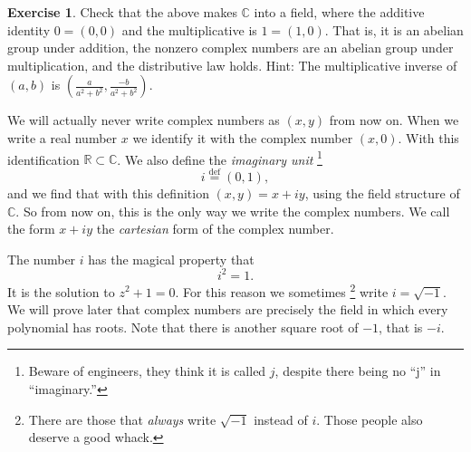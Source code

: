 \documentclass[12pt,openany]{book}
\newcommand{\C}{{\mathbb{C}}}
\newcommand{\R}{{\mathbb{R}}}
\newcommand{\myindex}[1]{#1\index{#1}}
\theoremstyle{plain}
\theoremstyle{remark}
\newtheorem{remark}[thm]{Remark}
\theoremstyle{definition}
\newenvironment{exbox}{%
    \def\FrameCommand{\vrule width 1pt \relax\hspace {10pt}}%
    \MakeFramed {\advance \hsize -\width \FrameRestore }%
}{%
    \endMakeFramed
}
\theoremstyle{exercise}
\newtheorem{exercise}{Exercise}[section]
\theoremstyle{example}
\begin{document}
\begin{exbox}
\begin{exercise}
Check that the above makes $\C$ into a field, where the additive
identity $0=(0,0)$ and the multiplicative is $1=(1,0)$.
That is, it is an abelian group under addition,
the nonzero complex numbers are an abelian group under multiplication,
and the distributive law holds.  Hint: The multiplicative inverse of $(a,b)$
is $\left(\frac{a}{a^2+b^2},\frac{-b}{a^2+b^2}\right)$.
\end{exercise}
\end{exbox}

We will actually never write complex numbers as $(x,y)$ from now on.
When we write a real number $x$ we identify it with the
complex number $(x,0)$.
With this identification $\R \subset \C$.
We also define the \emph{\myindex{imaginary unit}}%
\footnote{Beware of engineers, they think it is called $j$, despite there
being no ``j'' in ``imaginary.''}%
\begin{equation*}
i \overset{\text{def}}{=} (0,1) ,
\end{equation*}
and we find that with this definition $(x,y) = x+iy$, using the field
structure of $\C$.  So from now on, this is the only way we write
the complex numbers.  We call the form $x+iy$ the \emph{\myindex{cartesian}}
form of the complex number.

The number $i$ has the magical property that
\begin{equation*}
i^2 = 1 .
\end{equation*}
It is the solution to $z^2+1=0$.
For this reason we sometimes%
\footnote{There are those that \emph{always} write $\sqrt{-1}$ instead of $i$.
Those people also deserve a good whack.}
write $i = \sqrt{-1}$.
We will prove later that complex numbers
are precisely the field in which every polynomial has roots.
Note that there is another square root of $-1$, that is $-i$.

\end{document}
